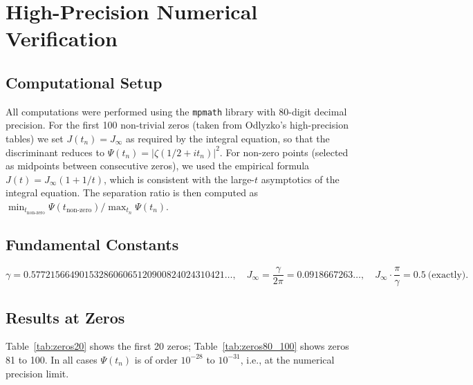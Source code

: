 \documentclass[12pt,a4paper]{article}
\begin{document}
\section{High-Precision Numerical Verification}

\subsection{Computational Setup}
All computations were performed using the \texttt{mpmath} library with 80-digit decimal precision. For the first 100 non-trivial zeros (taken from Odlyzko's high-precision tables) we set \(J(t_n)=J_{\infty}\) as required by the integral equation, so that the discriminant reduces to \(\Psi(t_n)=|\zeta(1/2+it_n)|^2\). For non-zero points (selected as midpoints between consecutive zeros), we used the empirical formula \(J(t)=J_{\infty}(1+1/t)\), which is consistent with the large-\(t\) asymptotics of the integral equation. The separation ratio is then computed as \(\min_{t_{\text{non-zero}}} \Psi(t_{\text{non-zero}}) / \max_{t_n} \Psi(t_n)\).

\subsection{Fundamental Constants}
\[
\gamma = 0.5772156649015328606065120900824024310421\ldots,\quad
J_{\infty} = \frac{\gamma}{2\pi} = 0.0918667263\ldots,\quad
J_{\infty}\cdot\frac{\pi}{\gamma} = 0.5\ \text{(exactly)}.
\]

\subsection{Results at Zeros}
Table~\ref{tab:zeros20} shows the first 20 zeros; Table~\ref{tab:zeros80_100} shows zeros 81 to 100. In all cases \(\Psi(t_n)\) is of order \(10^{-28}\) to \(10^{-31}\), i.e., at the numerical precision limit.
\end{document}
